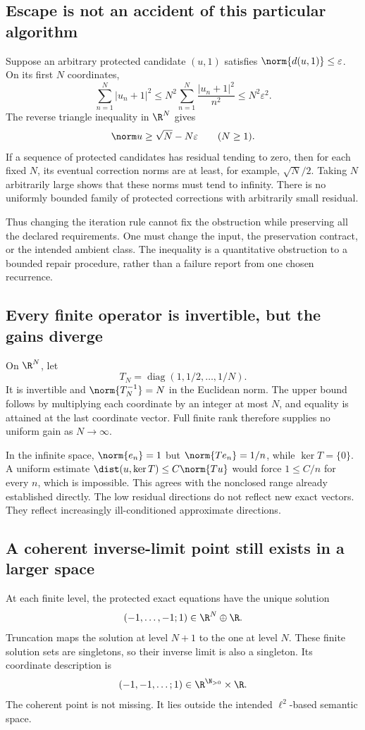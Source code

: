 \subsection{Escape is not an accident of this particular algorithm}
Suppose an arbitrary protected candidate \((u,1)\) satisfies \(\norm{d(u,1)}\le\varepsilon\). On its first \(N\) coordinates,
\[
 \sum_{n=1}^{N}|u_n+1|^2
 \le N^2\sum_{n=1}^{N}\frac{|u_n+1|^2}{n^2}
 \le N^2\varepsilon^2.
\]
The reverse triangle inequality in \(\R^N\) gives
\begin{equation}\label{eq:escape-necessity}
 \norm u\ge\sqrt N-N\varepsilon\qquad(N\ge1).
\end{equation}
If a sequence of protected candidates has residual tending to zero, then for each fixed \(N\), its eventual correction norms are at least, for example, \(\sqrt N/2\). Taking \(N\) arbitrarily large shows that these norms must tend to infinity. There is no uniformly bounded family of protected corrections with arbitrarily small residual.

Thus changing the iteration rule cannot fix the obstruction while preserving all the declared requirements. One must change the input, the preservation contract, or the intended ambient class. The inequality is a quantitative obstruction to a bounded repair procedure, rather than a failure report from one chosen recurrence.

\subsection{Every finite operator is invertible, but the gains diverge}
On \(\R^N\), let
\[
 T_N=\operatorname{diag}(1,1/2,\ldots,1/N).
\]
It is invertible and \(\norm{T_N^{-1}}=N\) in the Euclidean norm. The upper bound follows by multiplying each coordinate by an integer at most \(N\), and equality is attained at the last coordinate vector. Full finite rank therefore supplies no uniform gain as \(N\to\infty\).

In the infinite space, \(\norm{e_n}=1\) but \(\norm{Te_n}=1/n\), while \(\ker T=\{0\}\). A uniform estimate
\(\dist(u,\ker T)\le C\norm{Tu}\) would force \(1\le C/n\) for every \(n\), which is impossible. This agrees with the nonclosed range already established directly. The low residual directions do not reflect new exact vectors. They reflect increasingly ill-conditioned approximate directions.

\subsection{A coherent inverse-limit point still exists in a larger space}
At each finite level, the protected exact equations have the unique solution
\[
 (-1,\ldots,-1;1)\in\R^N\oplus\R.
\]
Truncation maps the solution at level \(N+1\) to the one at level \(N\). These finite solution sets are singletons, so their inverse limit is also a singleton. Its coordinate description is
\[
 (-1,-1,\ldots;1)\in\R^{\N_{>0}}\times\R.
\]
The coherent point is not missing. It lies outside the intended \(\ell^2\)-based semantic space.

